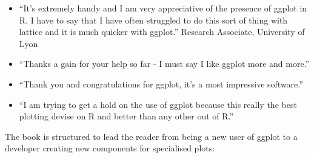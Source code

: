\documentclass[oneside,letterpaper]{scrartcl}
\begin{document}
\begin{itemize}
	\item ``It's extremely handy and I am very appreciative of the presence of ggplot in R.  I have to say that I have often struggled to do this sort of thing with lattice and it is much quicker with ggplot.'' Research Associate, University of Lyon

	\item ``Thanks a gain for your help so far - I must say I like ggplot more and more.''

	\item ``Thank you and congratulations for ggplot, it's a most impressive software.''

	\item ``I am trying to get a hold on the use of ggplot because this really the best plotting devise on R and better than any other out of R.''
\end{itemize}

The book is structured to lead the reader from being a new user of ggplot to a developer creating new components for specialised plots:
\end{document}
